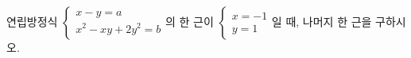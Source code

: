 연립방정식 $\begin{cases} x-y=a \\ x^2-xy+2y^2=b \end{cases}$의 한 근이 $\begin{cases} x=-1 \\ y=1 \end{cases}$일 때, 나머지 한 근을 구하시오. 
